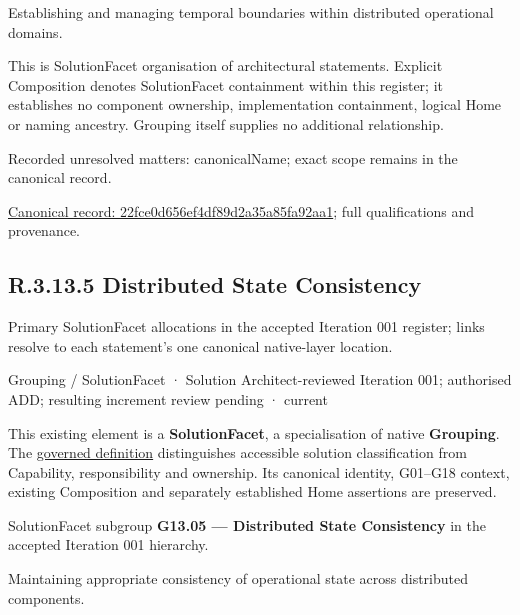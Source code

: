 Establishing and managing temporal boundaries within distributed operational domains.



This is SolutionFacet organisation of architectural statements. Explicit Composition denotes SolutionFacet containment within this register; it establishes no component ownership, implementation containment, logical Home or naming ancestry. Grouping itself supplies no additional relationship.


{\small Recorded unresolved matters: canonicalName; exact scope remains in the canonical record.}\par
{\footnotesize \href{../../../../../../../continuum/grouping/22fce0d656ef4df89d2a35a85fa92aa1.md}{Canonical record: 22fce0d656ef4df89d2a35a85fa92aa1}; full qualifications and provenance.}\par
\subsection*{R.3.13.5 Distributed State Consistency}
\label{navigation:R.3.13.5}

Primary SolutionFacet allocations in the accepted Iteration 001 register; links resolve to each statement’s one canonical native-layer location.\par
\label{element:71b9830ce1a543548334647cbbaec7f1}
{\small Grouping / SolutionFacet · Solution Architect-reviewed Iteration 001; authorised ADD; resulting increment review pending · current}\par

This existing element is a \textbf{SolutionFacet}, a specialisation of native
\textbf{Grouping}. The \href{\detokenize{../../../../../../../governance/continuum-representation.md#solutionfacet-classification--1119-candidate}}{governed definition}
distinguishes accessible solution classification from Capability, responsibility
and ownership. Its canonical identity, G01–G18 context, existing Composition
and separately established Home assertions are preserved.



SolutionFacet subgroup \textbf{G13.05 — Distributed State Consistency} in the accepted Iteration 001 hierarchy.



Maintaining appropriate consistency of operational state across distributed components.



